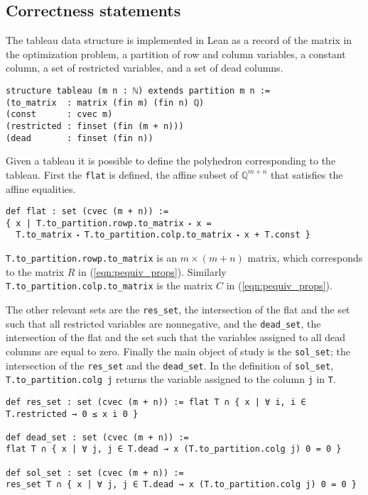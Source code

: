 \documentclass[11pt]{article} %
\begin{document}
\subsection{Correctness statements}

The tableau data structure is implemented in Lean as a record of the matrix in the optimization problem, a partition of row and column variables, a constant column, a set of restricted variables, and a set of dead columns.

\begin{lstlisting}
structure tableau (m n : ℕ) extends partition m n :=
(to_matrix  : matrix (fin m) (fin n) ℚ)
(const      : cvec m)
(restricted : finset (fin (m + n)))
(dead       : finset (fin n))
\end{lstlisting}
Given a tableau it is possible to define the polyhedron corresponding to the tableau. First the \verb|flat| is defined, the affine subset of $\mathbb{Q}^{m + n}$ that satisfies the affine equalities.

\begin{lstlisting}
def flat : set (cvec (m + n)) :=
{ x | T.to_partition.rowp.to_matrix ⬝ x =
  T.to_matrix ⬝ T.to_partition.colp.to_matrix ⬝ x + T.const }
\end{lstlisting}

\verb|T.to_partition.rowp.to_matrix| is an $m \times (m + n)$ matrix, which corresponds to the matrix $R$ in (\ref{eqn:pequiv_props}). Similarly \verb|T.to_partition.colp.to_matrix| is the matrix $C$ in (\ref{eqn:pequiv_props}).

The other relevant sets are the \verb|res_set|, the intersection of the flat and the set such that all restricted variables are nonnegative, and the \verb|dead_set|, the intersection of the flat and the set such that the variables assigned to all dead columns are equal to zero. Finally the main object of study is the \verb|sol_set|; the intersection of the \verb|res_set| and the \verb|dead_set|. In the definition of \lstinline|sol_set|, \lstinline|T.to_partition.colg j| returns the variable assigned to the column \lstinline |j| in \lstinline|T|.

\begin{lstlisting}
def res_set : set (cvec (m + n)) := flat T ∩ { x | ∀ i, i ∈ T.restricted → 0 ≤ x i 0 }

def dead_set : set (cvec (m + n)) :=
flat T ∩ { x | ∀ j, j ∈ T.dead → x (T.to_partition.colg j) 0 = 0 }

def sol_set : set (cvec (m + n)) :=
res_set T ∩ { x | ∀ j, j ∈ T.dead → x (T.to_partition.colg j) 0 = 0 }
\end{lstlisting}
\end{document}
